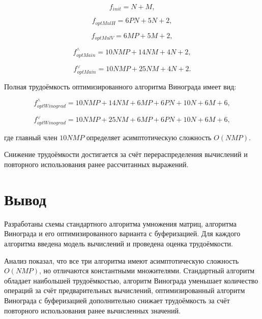 \begin{equation}
	f_{init} = N + M,
\end{equation}

\begin{equation}
	f_{optMulH} = 6PN + 5N + 2,
\end{equation}

\begin{equation}
	f_{optMulV} = 6MP + 5M + 2,
\end{equation}

\begin{equation}
	f_{optMain}^{\wedge} = 10NMP + 14NM + 4N + 2,
\end{equation}

\begin{equation}
	f_{optMain}^{\vee} = 10NMP + 25NM + 4N + 2.
\end{equation}

Полная трудоёмкость оптимизированного алгоритма Винограда имеет вид:

\begin{equation}
	f_{optWinograd}^{\wedge} = 10NMP + 14NM + 6MP + 6PN + 10N + 6M + 6,
\end{equation}

\begin{equation}
	f_{optWinograd}^{\vee} = 10NMP + 25NM + 6MP + 6PN + 10N + 6M + 6,
\end{equation}

где главный член $10NMP$ определяет асимптотическую сложность $O(NMP)$.

Снижение трудоёмкости достигается за счёт перераспределения вычислений и повторного использования ранее рассчитанных выражений.

\section*{Вывод}

Разработаны схемы стандартного алгоритма умножения матриц, алгоритма Винограда и его оптимизированного варианта с буферизацией. Для каждого алгоритма введена модель вычислений и проведена оценка трудоёмкости.

Анализ показал, что все три алгоритма имеют асимптотическую сложность $O(NMP)$, но отличаются константными множителями. 
Стандартный алгоритм обладает наибольшей трудоёмкостью, 
алгоритм Винограда уменьшает количество операций за счёт предварительных вычислений, оптимизированный алгоритм Винограда с буферизацией дополнительно снижает трудоёмкость за счёт повторного использования ранее вычисленных значений.

\clearpage

